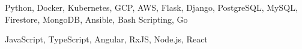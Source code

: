 


\begin{cventries}


\cventry
{} %
{}
{}
{}
{%
\begin{cvitems}
\item {Python, Docker, Kubernetes, GCP, AWS, Flask, Django, PostgreSQL, MySQL, Firestore, MongoDB, Ansible, Bash Scripting, Go}
\item {JavaScript, TypeScript, Angular, RxJS, Node.js, React}
\end{cvitems}
}


\end{cventries}
